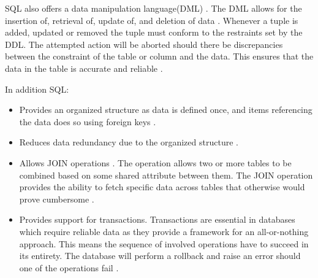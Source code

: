 SQL also offers a data manipulation language(DML) \cite{sql-components}.
The DML allows for the insertion of, retrieval of, update of, and deletion of data \cite{sql-dml-options}.
Whenever a tuple is added, updated or removed the tuple must conform to the restraints set by the DDL.
The attempted action will be aborted should there be discrepancies between the constraint of the table or column and the data.
This ensures that the data in the table is accurate and reliable \cite{sql-constraints}.

In addition SQL:
\begin{itemize}
    \item Provides an organized structure as data is defined once, and items referencing the data does so using foreign keys \cite{upwork-sql-adv}.
    \item Reduces data redundancy due to the organized structure \cite{upwork-sql-adv}.
    \item Allows JOIN operations \cite{upwork-sql-adv}.
    The operation allows two or more tables to be combined based on some shared attribute between them.
    The JOIN operation provides the ability to fetch specific data across tables that otherwise would prove cumbersome \cite{sql-joins}.
    \item Provides support for transactions.
    Transactions are essential in databases which require reliable data as they provide a framework for an all-or-nothing approach.
    This means the sequence of involved operations have to succeed in its entirety.
    The database will perform a rollback and raise an error should one of the operations fail \cite{sql-transactions}.
\end{itemize}

